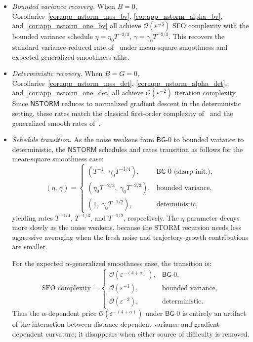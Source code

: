 \documentclass[letter,11pt]{article}
\newcommand{\Ocal}{\mathcal{O}}
\begin{document}
\begin{itemize}[leftmargin=*,label=\textbullet]
    \item \textit{Bounded variance recovery.}
    When $B=0$, Corollaries~\ref{cor:app_nstorm_mss_bv},
    \ref{cor:app_nstorm_alpha_bv}, and~\ref{cor:app_nstorm_one_bv} all achieve
    $\Ocal(\varepsilon^{-3})$ SFO complexity with the bounded variance
    schedule $\eta=\eta_0 T^{-2/3}$, $\gamma=\gamma_0 T^{-2/3}$. This
    recovers the standard variance-reduced rate
    of~\citet{fang2018spider,cutkosky2019momentum,chen2023generalized}
    under mean-square smoothness and expected generalized smoothness alike.

    \item \textit{Deterministic recovery.}
    When $B=G=0$, Corollaries~\ref{cor:app_nstorm_mss_det},
    \ref{cor:app_nstorm_alpha_det}, and~\ref{cor:app_nstorm_one_det} all
    achieve $\Ocal(\varepsilon^{-2})$ iteration complexity. Since $\mathsf{NSTORM}$ reduces to normalized gradient descent in the deterministic setting, these rates match the classical first-order complexity of~\citet{nesterov2004introductory} and the generalized smooth
    rates of~\citet{chen2023generalized}.

    \item \textit{Schedule transition.}
    As the noise weakens from $\mathsf{BG}$-0 to bounded variance to
    deterministic, the $\mathsf{NSTORM}$ schedules and rates transition as
    follows for the mean-square smoothness case:
    \[
        (\eta,\,\gamma)
        =
        \begin{cases}
            (T^{-1},\;\gamma_0 T^{-3/4}), & \mathsf{BG}\text{-}0
            \text{ (sharp init.)}, \\[3pt]
            (\eta_0 T^{-2/3},\;\gamma_0 T^{-2/3}), &
            \text{bounded variance}, \\[3pt]
            (1,\;\gamma_0 T^{-1/2}), & \text{deterministic},
        \end{cases}
    \]
    yielding rates $T^{-1/4}$, $T^{-1/3}$, and $T^{-1/2}$, respectively.
    The $\eta$ parameter decays more slowly as the noise weakens, because the
    STORM recursion needs less aggressive averaging when the fresh noise and
    trajectory-growth contributions are smaller.

    For the expected $\alpha$-generalized smoothness case, the transition is:
    \[
        \text{SFO complexity}
        =
        \begin{cases}
            \Ocal(\varepsilon^{-(4+\alpha)}), &
            \mathsf{BG}\text{-}0, \\[3pt]
            \Ocal(\varepsilon^{-3}), &
            \text{bounded variance}, \\[3pt]
            \Ocal(\varepsilon^{-2}), & \text{deterministic}.
        \end{cases}
    \]
    Thus the $\alpha$-dependent price $\Ocal(\varepsilon^{-(4+\alpha)})$
    under $\mathsf{BG}$-0 is entirely an artifact of the interaction
    between distance-dependent variance and gradient-dependent curvature; it
    disappears when either source of difficulty is removed.
\end{itemize}
\end{document}
